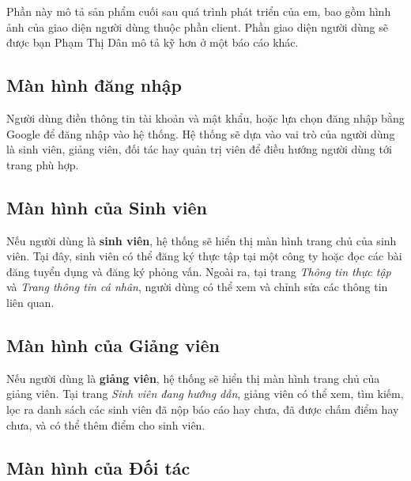 \documentclass[./../main.tex]{subfiles}
\begin{document}
Phần này mô tả sản phẩm cuối sau quá trình phát triển của em, bao gồm
hình ảnh của giao diện người dùng thuộc phần client. Phần giao diện
người dùng sẽ được bạn Phạm Thị Dân mô tả kỹ hơn ở một báo cáo khác.

\subsection{Màn hình đăng nhập}


Người dùng điền thông tin tài khoản và mật khẩu, hoặc lựa chọn đăng nhập
bằng Google để đăng nhập vào hệ thống. Hệ thống sẽ dựa vào vai trò của
người dùng là sinh viên, giảng viên, đối tác hay quản trị viên để điều
hướng người dùng tới trang phù hợp.

\subsection{Màn hình của Sinh viên}

Nếu người dùng là \textbf{sinh viên}, hệ thống sẽ hiển thị màn hình
trang chủ của sinh viên. Tại đây, sinh viên có thể đăng ký thực tập tại
một công ty hoặc đọc các bài đăng tuyển dụng và đăng ký phỏng vấn. Ngoài
ra, tại trang \emph{Thông tin thực tập} và \emph{Trang thông tin cá
nhân}, người dùng có thể xem và chỉnh sửa các thông tin liên quan.

\subsection{Màn hình của Giảng viên}


Nếu người dùng là \textbf{giảng viên}, hệ thống sẽ hiển thị màn hình
trang chủ của giảng viên. Tại trang \emph{Sinh viên đang hướng dẫn},
giảng viên có thể xem, tìm kiếm, lọc ra danh sách các sinh viên đã nộp
báo cáo hay chưa, đã được chấm điểm hay chưa, và có thể thêm điểm cho
sinh viên.

\subsection{Màn hình của Đối tác}

\end{document}
